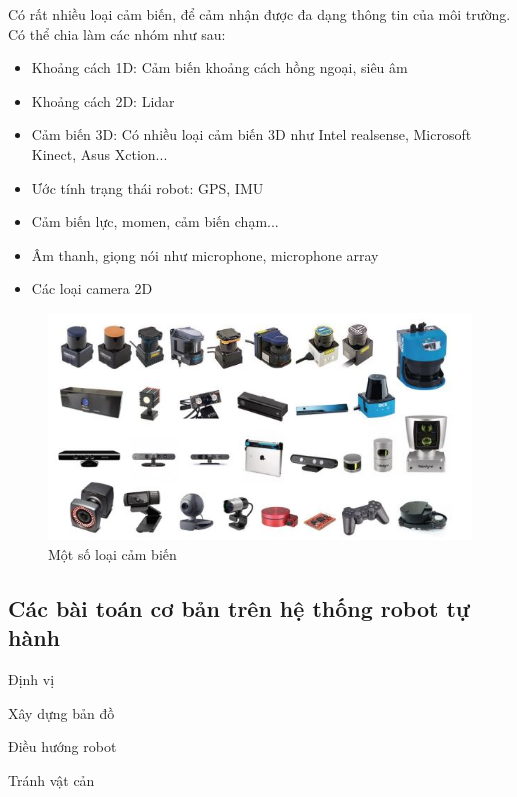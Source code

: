Có rất nhiều loại cảm biến, để cảm nhận được đa dạng thông tin của môi trường. Có thể chia làm các nhóm như sau:
\begin{itemize}
	\item Khoảng cách 1D: Cảm biến khoảng cách hồng ngoại, siêu âm
	\item Khoảng cách 2D: Lidar
	\item Cảm biến 3D: Có nhiều loại cảm biến 3D như Intel realsense, Microsoft Kinect, Asus Xction...
	\item Ước tính trạng thái robot: GPS, IMU
	\item Cảm biến lực, momen, cảm biến chạm...
	\item Âm thanh, giọng nói như microphone, microphone array
	\item Các loại camera 2D
\end{itemize}

\begin{figure}
	\centering
	\includegraphics[width=\linewidth]{chapter1/figs/CacloaiCB.JPG}
	\caption{Một số loại cảm biến}
	\label{fig:cacLoaiCambien}
\end{figure}

\subsection{Các bài toán cơ bản trên hệ thống robot tự hành}
Định vị

Xây dựng bản đồ

Điều hướng robot

Tránh vật cản

